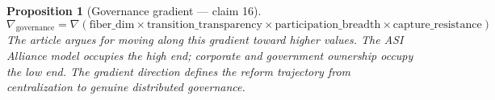 \documentclass[11pt,a4paper]{article}
\newtheorem{proposition}[definition]{Proposition}
\begin{document}
\begin{proposition}[Governance gradient --- claim 16]
\label{prop:governance_grad}
\[
  \nabla_{\text{governance}} = \nabla\left(\text{fiber\_dim} \times
    \text{transition\_transparency} \times
    \text{participation\_breadth} \times
    \text{capture\_resistance}\right)
\]
The article argues for moving along this gradient toward higher values.
The ASI Alliance model occupies the high end; corporate and government
ownership occupy the low end. The gradient direction defines the reform
trajectory from centralization to genuine distributed governance.
\end{proposition}
\end{document}
